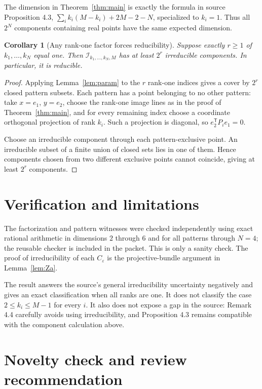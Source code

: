\documentclass[11pt]{article}
\newtheorem{corollary}[theorem]{Corollary}
\newcommand{\cI}{\mathcal I}
\begin{document}
The dimension in Theorem~\ref{thm:main} is exactly the formula in source
Proposition 4.3,
$\sum_i k_i(M-k_i)+2M-2-N$, specialized to $k_i=1$.  Thus all $2^N$
components containing real points have the same expected dimension.

\begin{corollary}[Any rank-one factor forces reducibility]\label{cor:mixed}
Suppose exactly $r\geq1$ of $k_1,\ldots,k_N$ equal one.  Then
$\cI_{k_1,\ldots,k_N,M}$ has at least $2^r$ irreducible components.  In
particular, it is reducible.
\end{corollary}

\begin{proof}
Applying Lemma~\ref{lem:param} to the $r$ rank-one indices gives a cover by
$2^r$ closed pattern subsets.  Each pattern has a point belonging to no
other pattern: take $x=e_1$, $y=e_2$, choose the rank-one image lines as in
the proof of Theorem~\ref{thm:main}, and for every remaining index choose a
coordinate orthogonal projection of rank $k_i$.  Such a projection is
diagonal, so $e_2^{\mathsf T}P_i e_1=0$.

Choose an irreducible component through each pattern-exclusive point.  An
irreducible subset of a finite union of closed sets lies in one of them.
Hence components chosen from two different exclusive points cannot coincide,
giving at least $2^r$ components.
\end{proof}

\section{Verification and limitations}

The factorization and pattern witnesses were checked independently using
exact rational arithmetic in dimensions $2$ through $6$ and for all patterns
through $N=4$; the reusable checker is included in the packet.  This is only
a sanity check.  The proof of irreducibility of each $C_\varepsilon$ is the
projective-bundle argument in Lemma~\ref{lem:Za}.

The result answers the source's general irreducibility uncertainty negatively
and gives an exact classification when all ranks are one.  It does not
classify the case $2\leq k_i\leq M-1$ for every $i$.  It also does not expose
a gap in the source: Remark 4.4 carefully avoids using irreducibility, and
Proposition 4.3 remains compatible with the component calculation above.

\section{Novelty check and review recommendation}
\end{document}
